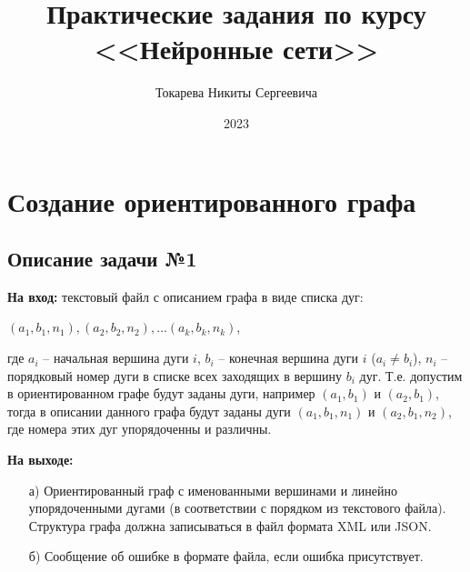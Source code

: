 \documentclass[bachelor, och, otchet]{template}
\begin{document}
\title{Практические задания по курсу <<Нейронные сети>>}





\author{Токарева Никиты Сергеевича}




\date{2023}

\maketitle




\section{Создание ориентированного графа}

\subsection{Описание задачи №1}
\textbf{На вход:} текстовый файл с описанием графа в виде списка дуг:

\begin{center}
    $(a_1, b_1, n_1), (a_2, b_2, n_2), \dots (a_k, b_k, n_k)$,
\end{center}

где $a_i$ -- начальная вершина дуги $i$, $b_i$ -- конечная вершина дуги $i$ ($a_i \neq b_i$), $n_i$ -- порядковый номер дуги
в списке всех заходящих в вершину $b_i$ дуг. Т.е. допустим в ориентированном графе будут заданы дуги, например $(a_1, b_1)$ и $(a_2, b_1)$,
тогда в описании данного графа будут заданы дуги $(a_1, b_1, n_1)$ и $(a_2, b_1, n_2)$, где номера этих дуг упорядоченны и различны.

\textbf{На выходе:}

\begin{itemize}
    \item[а)] Ориентированный граф с именованными вершинами и линейно упорядоченными дугами (в соответствии с порядком из текстового файла).
    Структура графа должна записываться в файл формата XML или JSON.
    \item[б)] Сообщение об ошибке в формате файла, если ошибка присутствует.
\end{itemize}
\end{document}
